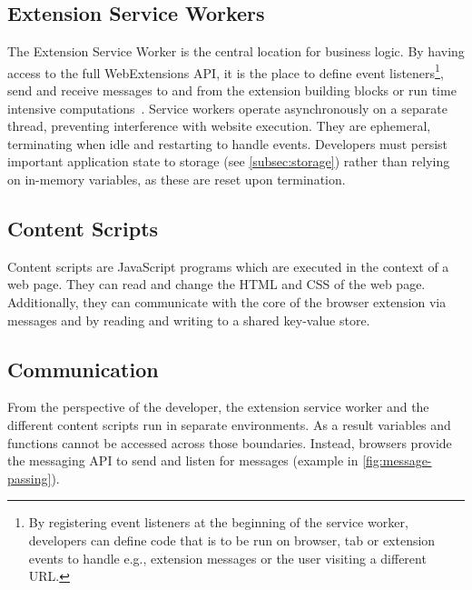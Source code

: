 \subsection{Extension Service Workers} \label{subsec:service-workers}
The Extension Service Worker is the central location for business logic.
By having access to the full WebExtensions API, it is the place to define event listeners\footnote{
By registering event listeners at the beginning of the service worker, developers can define code that is to be run on browser, tab or extension events to handle e.g., extension messages or the user visiting a different URL.},
send and receive messages to and from the extension building blocks 
or run time intensive computations~\cite[Ch. 4]{frisbie2023browser}.
Service workers operate asynchronously on a separate thread, preventing interference with website execution. 
They are ephemeral, terminating when idle and restarting to handle events. Developers must persist important application state to storage (see \cref{subsec:storage}) rather than relying on in-memory variables, as these are reset upon termination.

\subsection{Content Scripts} \label{subsec:content-scripts}
Content scripts are JavaScript programs which are executed in the context of a web page.
They can read and change the HTML and CSS of the web page. 
Additionally, they can communicate with the core of the browser extension via messages and by reading and writing to a shared key-value store.

\subsection{Communication}
From the perspective of the developer, the extension service worker and the different content scripts run in separate environments. 
As a result variables and functions cannot be accessed across those boundaries.
Instead, browsers provide the messaging API to send and listen for messages (example in \cref{fig:message-passing}).

